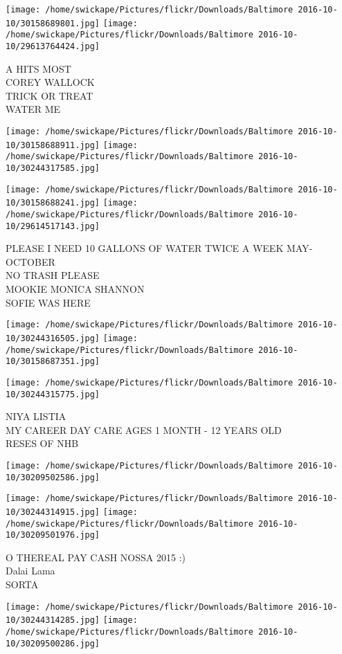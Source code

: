 \documentclass[10pt,letterpaper]{article}
\begin{document}
\texttt{[image: /home/swickape/Pictures/flickr/Downloads/Baltimore 2016-10-10/30158689801.jpg]}
\texttt{[image: /home/swickape/Pictures/flickr/Downloads/Baltimore 2016-10-10/29613764424.jpg]}

A HITS MOST\\
COREY WALLOCK\\
TRICK OR TREAT\\
WATER ME
\pagebreak

\texttt{[image: /home/swickape/Pictures/flickr/Downloads/Baltimore 2016-10-10/30158688911.jpg]}
\texttt{[image: /home/swickape/Pictures/flickr/Downloads/Baltimore 2016-10-10/30244317585.jpg]}

\texttt{[image: /home/swickape/Pictures/flickr/Downloads/Baltimore 2016-10-10/30158688241.jpg]}
\texttt{[image: /home/swickape/Pictures/flickr/Downloads/Baltimore 2016-10-10/29614517143.jpg]}

PLEASE I NEED 10 GALLONS OF WATER TWICE A WEEK MAY{-}OCTOBER\\
NO TRASH PLEASE\\
MOOKIE MONICA SHANNON\\
SOFIE WAS HERE
\pagebreak

\texttt{[image: /home/swickape/Pictures/flickr/Downloads/Baltimore 2016-10-10/30244316505.jpg]}
\texttt{[image: /home/swickape/Pictures/flickr/Downloads/Baltimore 2016-10-10/30158687351.jpg]}

\texttt{[image: /home/swickape/Pictures/flickr/Downloads/Baltimore 2016-10-10/30244315775.jpg]}

NIYA LISTIA\\
MY CAREER DAY CARE AGES 1 MONTH {-} 12 YEARS OLD\\
RESES OF NHB
\pagebreak

\texttt{[image: /home/swickape/Pictures/flickr/Downloads/Baltimore 2016-10-10/30209502586.jpg]}

\vspace{0.25in}
\texttt{[image: /home/swickape/Pictures/flickr/Downloads/Baltimore 2016-10-10/30244314915.jpg]}
\texttt{[image: /home/swickape/Pictures/flickr/Downloads/Baltimore 2016-10-10/30209501976.jpg]}

O THEREAL PAY CASH NOSSA 2015 :)\\
Dalai Lama\\
SORTA
\pagebreak

\texttt{[image: /home/swickape/Pictures/flickr/Downloads/Baltimore 2016-10-10/30244314285.jpg]}
\texttt{[image: /home/swickape/Pictures/flickr/Downloads/Baltimore 2016-10-10/30209500286.jpg]}
\end{document}
